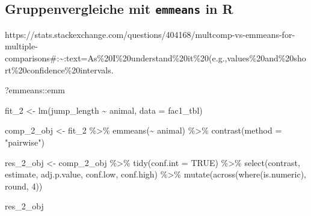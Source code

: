\documentclass[
  letterpaper,
  DIV=11,
  oneside]{scrreport}
\newenvironment{Shaded}{\begin{snugshade}}{\end{snugshade}}
\newcommand{\AttributeTok}[1]{\textcolor[rgb]{0.40,0.45,0.13}{#1}}
\newcommand{\ConstantTok}[1]{\textcolor[rgb]{0.56,0.35,0.01}{#1}}
\newcommand{\DecValTok}[1]{\textcolor[rgb]{0.68,0.00,0.00}{#1}}
\newcommand{\FunctionTok}[1]{\textcolor[rgb]{0.28,0.35,0.67}{#1}}
\newcommand{\NormalTok}[1]{\textcolor[rgb]{0.00,0.23,0.31}{#1}}
\newcommand{\OtherTok}[1]{\textcolor[rgb]{0.00,0.23,0.31}{#1}}
\newcommand{\SpecialCharTok}[1]{\textcolor[rgb]{0.37,0.37,0.37}{#1}}
\newcommand{\StringTok}[1]{\textcolor[rgb]{0.13,0.47,0.30}{#1}}
\begin{document}
\hypertarget{gruppenvergleiche-mit-emmeans-in-r}{%
\subsection{\texorpdfstring{Gruppenvergleiche mit \texttt{emmeans} in
R}{Gruppenvergleiche mit emmeans in R}}\label{gruppenvergleiche-mit-emmeans-in-r}}

https://stats.stackexchange.com/questions/404168/multcomp-vs-emmeans-for-multiple-comparisons\#:\textasciitilde:text=As\%20I\%20understand\%20it\%20(e.g.,values\%20and\%20short\%20confidence\%20intervals.

?emmeans::emm


\begin{Shaded}
\begin{Highlighting}[]
\NormalTok{fit\_2 }\OtherTok{\textless{}{-}} \FunctionTok{lm}\NormalTok{(jump\_length }\SpecialCharTok{\textasciitilde{}}\NormalTok{ animal, }\AttributeTok{data =}\NormalTok{ fac1\_tbl)}

\NormalTok{comp\_2\_obj }\OtherTok{\textless{}{-}}\NormalTok{ fit\_2 }\SpecialCharTok{\%\textgreater{}\%} 
  \FunctionTok{emmeans}\NormalTok{(}\SpecialCharTok{\textasciitilde{}}\NormalTok{ animal) }\SpecialCharTok{\%\textgreater{}\%} 
  \FunctionTok{contrast}\NormalTok{(}\AttributeTok{method =} \StringTok{"pairwise"}\NormalTok{) }
\end{Highlighting}
\end{Shaded}

\begin{Shaded}
\begin{Highlighting}[]
\NormalTok{res\_2\_obj }\OtherTok{\textless{}{-}}\NormalTok{ comp\_2\_obj }\SpecialCharTok{\%\textgreater{}\%} 
  \FunctionTok{tidy}\NormalTok{(}\AttributeTok{conf.int =} \ConstantTok{TRUE}\NormalTok{) }\SpecialCharTok{\%\textgreater{}\%} 
  \FunctionTok{select}\NormalTok{(contrast, estimate, adj.p.value, conf.low, conf.high) }\SpecialCharTok{\%\textgreater{}\%} 
  \FunctionTok{mutate}\NormalTok{(}\FunctionTok{across}\NormalTok{(}\FunctionTok{where}\NormalTok{(is.numeric), round, }\DecValTok{4}\NormalTok{))}

\NormalTok{res\_2\_obj}
\end{Highlighting}
\end{Shaded}
\end{document}
